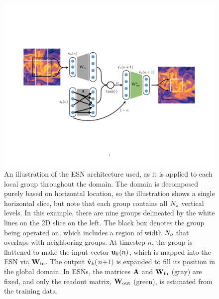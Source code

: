 \documentclass[draft]{agujournal2019}
\begin{document}
\begin{figure}
    \centering
    \includegraphics[width=\textwidth,
    trim={1in 2.4in 1in 2.4in}, clip
    ]{figures/labeled-esn-diagram/main.pdf}
    \caption{An illustration of the ESN architecture used, as it
        is applied to each local group throughout the domain.
        The domain is decomposed purely based on horizontal location, so the
        illustration shows a single horizontal slice, but note that each group
        contains all $N_{z}$ vertical levels.
        In this example, there are nine groups delineated by the white lines on
        the 2D slice on the left.
        The black box denotes the group being operated on, which includes a
        region of width $N_{o}$ that overlaps with neighboring groups.
        At timestep $n$, the group is flattened to make the input vector
        $\mathbf{u}_{k}(n)$, which is
        mapped into the ESN via $\mathbf{W}_\text{in}$.
        The output $\hat{\mathbf{v}}_{k}($$n$$+$$1$$)$ is expanded to fill its position in the global
        domain.
        In ESNs, the matrices $\mathbf{A}$ and $\mathbf{W}_\text{in}$ (gray) are fixed, and only
        the readout matrix, $\mathbf{W}_\text{out}$ (green), is estimated from the training data.
    }
    \label{fig:esn-diagram}
\end{figure}
\end{document}
